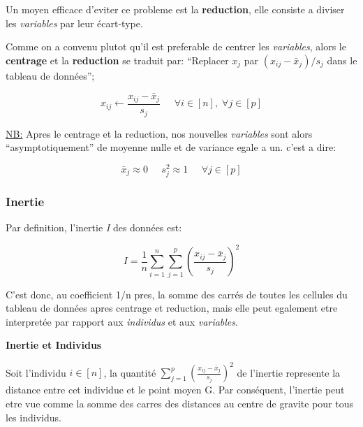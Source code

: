 \documentclass{article}
\begin{document}
Un moyen efficace d'eviter ce probleme est la \textbf{reduction}, elle consiste a diviser les \textit{variables} par leur écart-type.
\newline

Comme on a convenu plutot qu'il est preferable de centrer les \textit{variables}, alors le \textbf{centrage} et la \textbf{reduction} se traduit par: ``Replacer $x_j$ par $(x_{ij}-\bar{x}_j)/s_j$ dans le tableau de données'';

\begin{equation*}
x_{ij} \leftarrow \frac{x_{ij}-\bar{x}_j}{s_j}  \;\;\;\;\; \forall i \in [n], \; \forall j \in [p]
\end{equation*}
\newline

\underline{NB:} Apres le centrage et la reduction, nos nouvelles \textit{variables} sont alors ``asymptotiquement'' de moyenne nulle et de variance egale a un. c'est a dire:

\begin{equation*}
\bar{x}_j \approx 0 \;\;\;\;\; s_j^2 \approx 1 \;\;\;\;\; \forall j \in [p]
\end{equation*}

\subsubsection{Inertie}

Par definition, l'inertie \textit{I} des données est:

\begin{equation*}
I = \frac{1}{n} \sum_{i=1}^n \sum_{j=1}^p {\left( \frac{x_{ij}-\bar{x}_j}{s_j} \right)}^2
\end{equation*}

C'est donc, au coefficient 1/n pres, la somme des carrés de toutes les cellules du tableau de données apres centrage et reduction, mais elle peut egalement etre interpretée par rapport aux \textit{individus} et aux \textit{variables}.

\newpage

\begin{flushleft}
\textbf{Inertie et Individus}
\end{flushleft}

Soit l'individu $i \in [n]$, la quantité $\sum_{j=1}^p {\left( \frac{x_{ij}-\bar{x}_j}{s_j} \right)}^2$ de l'inertie represente la distance entre cet individue et le point moyen G. Par conséquent, l’inertie peut etre vue comme la somme des carres des distances au centre de gravite pour tous les individus.
\newline
\end{document}
